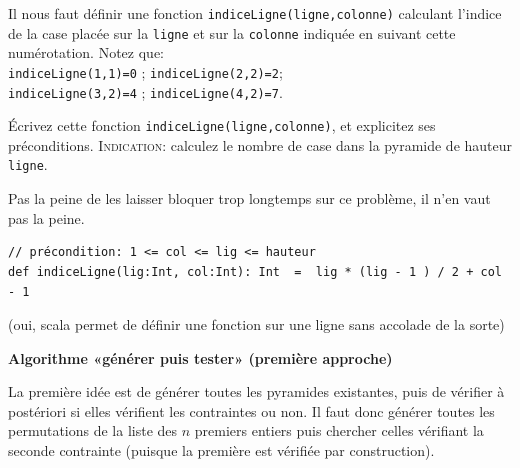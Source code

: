 \documentclass[10pt]{article}\usepackage[nu]{esial}
\begin{document}
Il nous faut définir une fonction \texttt{indiceLigne(ligne,colonne)} calculant
l'indice de la case placée sur la \texttt{ligne} et sur la \texttt{colonne}
indiquée en suivant cette numérotation. Notez que:\\
\texttt{indiceLigne(1,1)=0} ; \texttt{indiceLigne(2,2)=2};\\
\texttt{indiceLigne(3,2)=4} ; \texttt{indiceLigne(4,2)=7}. 

\begin{Question}
  Écrivez cette fonction \texttt{indiceLigne(ligne,colonne)}, et explicitez ses préconditions.
  \noindent\textsc{Indication:} calculez le nombre de case dans la pyramide de
  hauteur \texttt{ligne}.
\end{Question}
\begin{Reponse}
  Pas la peine de les laisser bloquer trop longtemps sur ce problème, il n'en
  vaut pas la peine.

\begin{Verbatim}
// précondition: 1 <= col <= lig <= hauteur 
def indiceLigne(lig:Int, col:Int): Int  =  lig * (lig - 1 ) / 2 + col - 1
\end{Verbatim}
(oui, scala permet de définir une fonction sur une ligne sans accolade de la sorte)
\end{Reponse}




\begin{Exercice}\textbf{Algorithme «générer puis tester» (première approche)}

  \noindent La première idée est de générer toutes les pyramides existantes,
  puis de vérifier à postériori si elles vérifient les contraintes ou non. Il
  faut donc générer toutes les permutations de la liste des $n$ premiers
  entiers puis chercher celles vérifiant la seconde contrainte (puisque la
  première est vérifiée par construction).
\end{Exercice}
\end{document}
